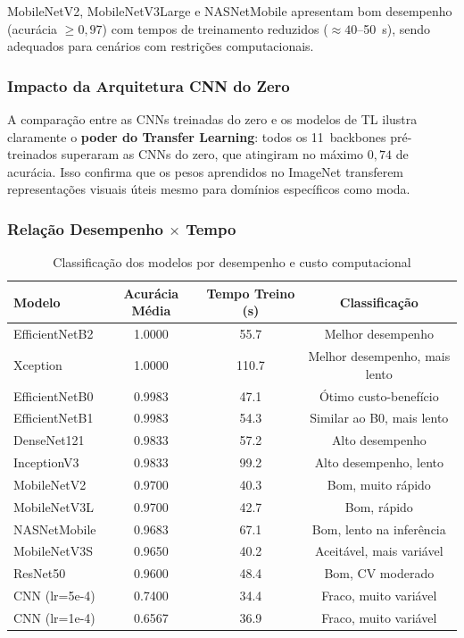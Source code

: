 \documentclass[12pt,a4paper]{article}
\begin{document}
MobileNetV2, MobileNetV3Large e NASNetMobile apresentam bom desempenho
(acurácia $\geq 0{,}97$) com tempos de treinamento reduzidos ($\approx 40$--50~s),
sendo adequados para cenários com restrições computacionais.

\subsubsection{Impacto da Arquitetura CNN do Zero}

A comparação entre as CNNs treinadas do zero e os modelos de TL ilustra
claramente o \textbf{poder do Transfer Learning}: todos os 11~backbones
pré-treinados superaram as CNNs do zero, que atingiram no máximo $0{,}74$ de acurácia.
Isso confirma que os pesos aprendidos no ImageNet transferem representações visuais
úteis mesmo para domínios específicos como moda.

\subsubsection{Relação Desempenho $\times$ Tempo}

\begin{table}[H]
\centering
\caption{Classificação dos modelos por desempenho e custo computacional}
\small
\begin{tabular}{lccc}
\toprule
\textbf{Modelo} & \textbf{Acurácia Média} & \textbf{Tempo Treino (s)} & \textbf{Classificação} \\
\midrule
EfficientNetB2  & 1.0000 & 55.7 & Melhor desempenho \\
Xception        & 1.0000 & 110.7 & Melhor desempenho, mais lento \\
EfficientNetB0  & 0.9983 & 47.1 & Ótimo custo-benefício \\
EfficientNetB1  & 0.9983 & 54.3 & Similar ao B0, mais lento \\
DenseNet121     & 0.9833 & 57.2 & Alto desempenho \\
InceptionV3     & 0.9833 & 99.2 & Alto desempenho, lento \\
MobileNetV2     & 0.9700 & 40.3 & Bom, muito rápido \\
MobileNetV3L    & 0.9700 & 42.7 & Bom, rápido \\
NASNetMobile    & 0.9683 & 67.1 & Bom, lento na inferência \\
MobileNetV3S    & 0.9650 & 40.2 & Aceitável, mais variável \\
ResNet50        & 0.9600 & 48.4 & Bom, CV moderado \\
CNN (lr=5e-4)   & 0.7400 & 34.4 & Fraco, muito variável \\
CNN (lr=1e-4)   & 0.6567 & 36.9 & Fraco, muito variável \\
\bottomrule
\end{tabular}
\end{table}
\end{document}
